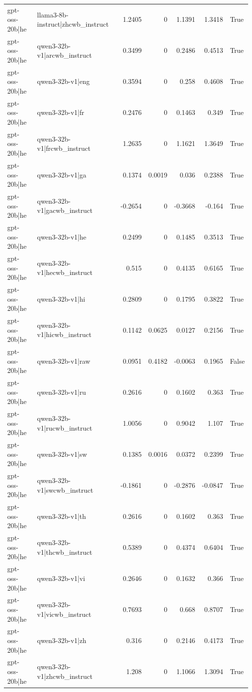 \begin{table}
\begin{tabular}{l l r r r r l}
gpt-oss-20b|he & llama3-8b-instruct|zhcwb_instruct & 1.2405 & 0 & 1.1391 & 1.3418 & True \\
gpt-oss-20b|he & qwen3-32b-v1|arcwb_instruct & 0.3499 & 0 & 0.2486 & 0.4513 & True \\
gpt-oss-20b|he & qwen3-32b-v1|eng & 0.3594 & 0 & 0.258 & 0.4608 & True \\
gpt-oss-20b|he & qwen3-32b-v1|fr & 0.2476 & 0 & 0.1463 & 0.349 & True \\
gpt-oss-20b|he & qwen3-32b-v1|frcwb_instruct & 1.2635 & 0 & 1.1621 & 1.3649 & True \\
gpt-oss-20b|he & qwen3-32b-v1|ga & 0.1374 & 0.0019 & 0.036 & 0.2388 & True \\
gpt-oss-20b|he & qwen3-32b-v1|gacwb_instruct & -0.2654 & 0 & -0.3668 & -0.164 & True \\
gpt-oss-20b|he & qwen3-32b-v1|he & 0.2499 & 0 & 0.1485 & 0.3513 & True \\
gpt-oss-20b|he & qwen3-32b-v1|hecwb_instruct & 0.515 & 0 & 0.4135 & 0.6165 & True \\
gpt-oss-20b|he & qwen3-32b-v1|hi & 0.2809 & 0 & 0.1795 & 0.3822 & True \\
gpt-oss-20b|he & qwen3-32b-v1|hicwb_instruct & 0.1142 & 0.0625 & 0.0127 & 0.2156 & True \\
gpt-oss-20b|he & qwen3-32b-v1|raw & 0.0951 & 0.4182 & -0.0063 & 0.1965 & False \\
gpt-oss-20b|he & qwen3-32b-v1|ru & 0.2616 & 0 & 0.1602 & 0.363 & True \\
gpt-oss-20b|he & qwen3-32b-v1|rucwb_instruct & 1.0056 & 0 & 0.9042 & 1.107 & True \\
gpt-oss-20b|he & qwen3-32b-v1|sw & 0.1385 & 0.0016 & 0.0372 & 0.2399 & True \\
gpt-oss-20b|he & qwen3-32b-v1|swcwb_instruct & -0.1861 & 0 & -0.2876 & -0.0847 & True \\
gpt-oss-20b|he & qwen3-32b-v1|th & 0.2616 & 0 & 0.1602 & 0.363 & True \\
gpt-oss-20b|he & qwen3-32b-v1|thcwb_instruct & 0.5389 & 0 & 0.4374 & 0.6404 & True \\
gpt-oss-20b|he & qwen3-32b-v1|vi & 0.2646 & 0 & 0.1632 & 0.366 & True \\
gpt-oss-20b|he & qwen3-32b-v1|vicwb_instruct & 0.7693 & 0 & 0.668 & 0.8707 & True \\
gpt-oss-20b|he & qwen3-32b-v1|zh & 0.316 & 0 & 0.2146 & 0.4173 & True \\
gpt-oss-20b|he & qwen3-32b-v1|zhcwb_instruct & 1.208 & 0 & 1.1066 & 1.3094 & True \\

\end{tabular}
\end{table}
